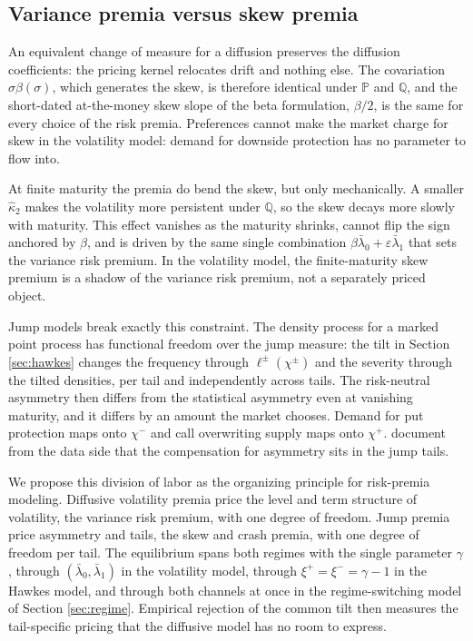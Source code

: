 \documentclass[11pt]{article}
\theoremstyle{remark}
\newcommand{\PP}{\mathbb{P}}
\newcommand{\QQ}{\mathbb{Q}}
\begin{document}
\subsection{Variance premia versus skew premia}
An equivalent change of measure for a diffusion preserves the diffusion coefficients: the pricing kernel relocates drift and nothing else. The covariation $\sigma\beta(\sigma)$, which generates the skew, is therefore identical under $\PP$ and $\QQ$, and the short-dated at-the-money skew slope of the beta formulation, $\beta/2$, is the same for every choice of the risk premia. Preferences cannot make the market charge for skew in the volatility model: demand for downside protection has no parameter to flow into.

At finite maturity the premia do bend the skew, but only mechanically. A smaller $\hat\kappa_{2}$ makes the volatility more persistent under $\QQ$, so the skew decays more slowly with maturity. This effect vanishes as the maturity shrinks, cannot flip the sign anchored by $\beta$, and is driven by the same single combination $\beta\bar\lambda_{0}+\varepsilon\bar\lambda_{1}$ that sets the variance risk premium. In the volatility model, the finite-maturity skew premium is a shadow of the variance risk premium, not a separately priced object.

Jump models break exactly this constraint. The density process for a marked point process has functional freedom over the jump measure: the tilt in Section \ref{sec:hawkes} changes the frequency through $\ell^{\pm}(\chi^{\pm})$ and the severity through the tilted densities, per tail and independently across tails. The risk-neutral asymmetry then differs from the statistical asymmetry even at vanishing maturity, and it differs by an amount the market chooses. Demand for put protection maps onto $\chi^{-}$ and call overwriting supply maps onto $\chi^{+}$. \cite{BollerslevTodorov2011} document from the data side that the compensation for asymmetry sits in the jump tails.

We propose this division of labor as the organizing principle for risk-premia modeling. Diffusive volatility premia price the level and term structure of volatility, the variance risk premium, with one degree of freedom. Jump premia price asymmetry and tails, the skew and crash premia, with one degree of freedom per tail. The equilibrium spans both regimes with the single parameter $\gamma$, through $(\bar\lambda_{0}, \bar\lambda_{1})$ in the volatility model, through $\xi^{+}=\xi^{-}=\gamma-1$ in the Hawkes model, and through both channels at once in the regime-switching model of Section \ref{sec:regime}. Empirical rejection of the common tilt then measures the tail-specific pricing that the diffusive model has no room to express.
\end{document}
